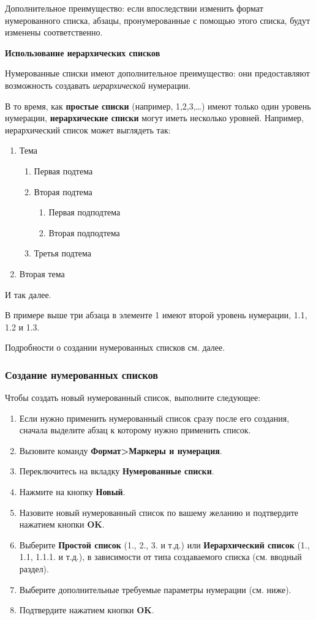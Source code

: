 \documentclass[a4paper,10pt]{article}
\begin{document}
Дополнительное преимущество: если впоследствии изменить формат нумерованного списка, абзацы, пронумерованные с помощью этого списка, будут изменены соответственно.

\textbf{Использование иерархических списков}

Нумерованные списки имеют дополнительное преимущество: они предоставляют возможность создавать \textit{иерархической} нумерации.

В то время, как \textbf{простые списки} (например, 1,2,3,…) имеют только один уровень нумерации, \textbf{иерархические списки} могут иметь несколько уровней. Например, иерархический список может выглядеть так:

\begin{enumerate}
  \item Тема
  \begin{enumerate}[label*=\arabic*.]
    \item Первая подтема
    \item Вторая подтема
    \begin{enumerate}[label*=\arabic*.]
      \item Первая подподтема
      \item Вторая подподтема
    \end{enumerate}
    \item Третья подтема
  \end{enumerate}
  \item Вторая тема
\end{enumerate}

И так далее.

В примере выше три абзаца в элементе 1 имеют второй уровень нумерации, 1.1, 1.2 и 1.3.

Подробности о создании нумерованных списков см. далее.

\subsubsection{Создание нумерованных списков}
Чтобы создать новый нумерованный список, выполните следующее:
\begin{enumerate}
 \item Если нужно применить нумерованный список сразу после его создания, сначала выделите абзац к которому нужно применить список.
 \item Вызовите команду \textbf{Формат>Маркеры и нумерация}.
 \item Переключитесь на вкладку \textbf{Нумерованные списки}.
 \item Нажмите на кнопку \textbf{Новый}.
 \item Назовите новый нумерованный список по вашему желанию и подтвердите нажатием кнопки \textbf{OK}.
 \item Выберите \textbf{Простой список} (1., 2., 3. и т.д.) или \textbf{Иерархический список} (1., 1.1, 1.1.1. и т.д.), в зависимости от типа создаваемого списка (см. вводный раздел).
 \item Выберите дополнительные требуемые параметры нумерации (см. ниже).
 \item Подтвердите нажатием кнопки \textbf{OK}.
\end{enumerate}
\end{document}
